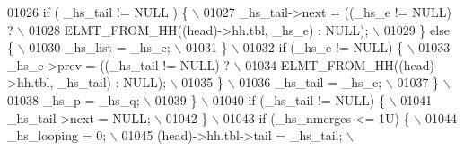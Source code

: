 \begin{DoxyCode}
{{{{{{{{{01026 \textcolor{preprocessor}{          if ( \_hs\_tail != NULL ) \{                                              \(\backslash\)}
01027 \textcolor{preprocessor}{            \_hs\_tail->next = ((\_hs\_e != NULL) ?                                  \(\backslash\)}
01028 \textcolor{preprocessor}{              ELMT\_FROM\_HH((head)->hh.tbl, \_hs\_e) : NULL);                       \(\backslash\)}
01029 \textcolor{preprocessor}{          \} else \{                                                               \(\backslash\)}
01030 \textcolor{preprocessor}{            \_hs\_list = \_hs\_e;                                                    \(\backslash\)}
01031 \textcolor{preprocessor}{          \}                                                                      \(\backslash\)}
01032 \textcolor{preprocessor}{          if (\_hs\_e != NULL) \{                                                   \(\backslash\)}
01033 \textcolor{preprocessor}{            \_hs\_e->prev = ((\_hs\_tail != NULL) ?                                  \(\backslash\)}
01034 \textcolor{preprocessor}{              ELMT\_FROM\_HH((head)->hh.tbl, \_hs\_tail) : NULL);                    \(\backslash\)}
01035 \textcolor{preprocessor}{          \}                                                                      \(\backslash\)}
01036 \textcolor{preprocessor}{          \_hs\_tail = \_hs\_e;                                                      \(\backslash\)}
01037 \textcolor{preprocessor}{        \}                                                                        \(\backslash\)}
01038 \textcolor{preprocessor}{        \_hs\_p = \_hs\_q;                                                           \(\backslash\)}
01039 \textcolor{preprocessor}{      \}                                                                          \(\backslash\)}
01040 \textcolor{preprocessor}{      if (\_hs\_tail != NULL) \{                                                    \(\backslash\)}
01041 \textcolor{preprocessor}{        \_hs\_tail->next = NULL;                                                   \(\backslash\)}
01042 \textcolor{preprocessor}{      \}                                                                          \(\backslash\)}
01043 \textcolor{preprocessor}{      if (\_hs\_nmerges <= 1U) \{                                                   \(\backslash\)}
01044 \textcolor{preprocessor}{        \_hs\_looping = 0;                                                         \(\backslash\)}
01045 \textcolor{preprocessor}{        (head)->hh.tbl->tail = \_hs\_tail;                                         \(\backslash\)}
}}}}}}}}}
\end{DoxyCode}
